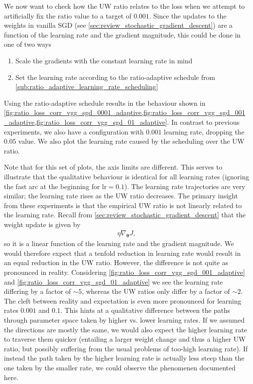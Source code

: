 We now want to check how the UW ratio relates to the loss when we attempt to
artificially fix the ratio value to a target of $0.001$. Since the updates to the
weights in vanilla SGD (see \cref{sec:review_stochastic_gradient_descent}) are a
function of the learning rate and the gradient magnitude, this could be done in
one of two ways
\begin{enumerate}
    \item Scale the gradients with the constant learning rate in mind
    \item Set the learning rate according to the ratio-adaptive schedule from
        \cref{sub:ratio_adaptive_learning_rate_scheduling}
\end{enumerate}

Using the ratio-adaptive schedule results in the behaviour shown in
\cref{fig:ratio_loss_corr_vgg_sgd_0001_adaptive,fig:ratio_loss_corr_vgg_sgd_001_adaptive,fig:ratio_loss_corr_vgg_sgd_01_adaptive}.
In contrast to previous experiments, we also have a configuration with $0.001$
learning rate, dropping the $0.05$ value. We also plot the learning rate caused
by the scheduling over the UW ratio.

Note that for this set of plots, the axis limits are different. This serves to
illustrate that the qualitative behaviour is identical for all learning rates
(ignoring the fast arc at the beginning for $\text{lr}=0.1$). The learning rate
trajectories are very similar; the learning rate rises as the UW ratio
decreases. The primary insight from these experiments is that the empirical UW ratio is
not linearly related to the learning rate. Recall from
\cref{sec:review_stochastic_gradient_descent} that the weight update is given by
\begin{align}
    \eta \nabla_{\boldsymbol\theta}J,
\end{align}
so it is a linear function of the learning rate and the gradient magnitude. We
would therefore expect that a tenfold reduction in learning rate would result in
an equal reduction in the UW ratio. However, the difference is not quite as
pronounced in reality. Considering
\cref{fig:ratio_loss_corr_vgg_sgd_001_adaptive} and
\cref{fig:ratio_loss_corr_vgg_sgd_01_adaptive} we see the learning rate
differing by a factor of $\sim{}5$, whereas the UW ratios only differ by a factor of
$\sim{}2$. The cleft between reality and expectation is even more pronounced for
learning rates $0.001$ and $0.1$. This hints at a qualitative difference between
the paths through parameter space taken by higher vs. lower learning rates. If
we assumed the directions are mostly the same, we would also expect the higher
learning rate to traverse them quicker (entailing a larger weight change and
thus a higher UW ratio, but possibly suffering from the usual problems of
too-high learning rate). If instead the path taken by the higher learning rate
is actually less steep than the one taken by the smaller rate, we could observe
the phenomenen documented here.


